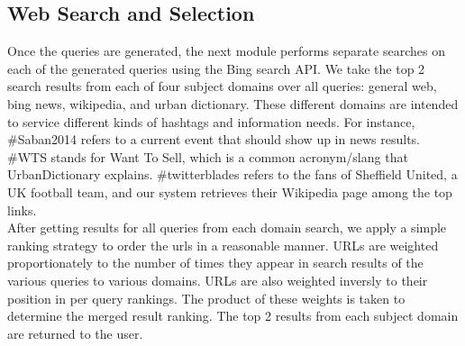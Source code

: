 \documentclass{sig-alternate}
\begin{document}


\subsection{Web Search and Selection}
Once the queries are generated, the next module performs separate searches on each of the generated queries using the Bing search API.  We take the top 2 search results from each of four subject domains over all queries: general web, bing news, wikipedia, and urban dictionary.  These different domains are intended to service different kinds of hashtags and information needs.  For instance, \#Saban2014 refers to a current event that should show up in news results.  \#WTS stands for Want To Sell, which is a common acronym/slang that UrbanDictionary explains. \#twitterblades refers to the fans of Sheffield United, a UK football team, and our system retrieves their Wikipedia page among the top links. \\
After getting results for all queries from each domain search, we apply a simple ranking strategy to order the urls in a reasonable manner.  URLs are weighted proportionately to the number of times they appear in search results of the various queries to various domains.  URLs are also weighted inversly to their position in per query rankings.  The product of these weights is taken to determine the merged result ranking.  The top 2 results from each subject domain are returned to the user.\\
\end{document}
